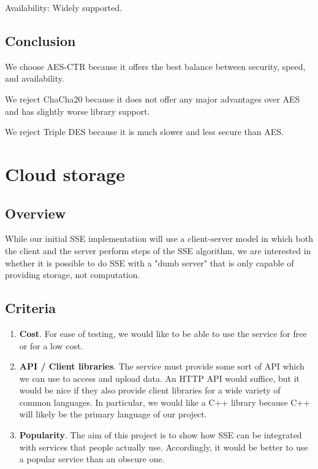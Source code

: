 \documentclass[onecolumn, draftclsnofoot,10pt, compsoc]{IEEEtran}
\begin{document}
Availability: Widely supported.

\subsection{ Conclusion }

We choose AES-CTR because it offers the best balance between security, speed, and availability.

We reject ChaCha20 because it does not offer any major advantages over AES and has slightly worse library support.

We reject Triple DES because it is much slower and less secure than AES.

\section{ Cloud storage }

\subsection{ Overview }

While our initial SSE implementation will use a client-server model in which both the client and the server perform steps of the SSE algorithm, we are interested in whether it is possible to do SSE with a "dumb server" that is only capable of providing storage, not computation.

\subsection{ Criteria }

\begin{enumerate}
  \item \textbf{Cost}.
  For ease of testing, we would like to be able to use the service for free or for a low cost.

  \item \textbf{API / Client libraries}.
  The service must provide some sort of API which we can use to access and upload data. An HTTP API would suffice, but it would be nice if they also provide client libraries for a wide variety of common languages. In particular, we would like a C++ library because C++ will likely be the primary language of our project.

  \item \textbf{Popularity}.
  The aim of this project is to show how SSE can be integrated with services that people actually use.
  Accordingly, it would be better to use a popular service than an obscure one.
\end{enumerate}
\end{document}
